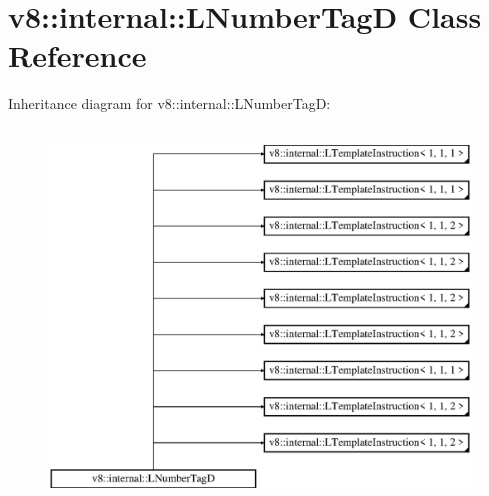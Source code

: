 \hypertarget{classv8_1_1internal_1_1_l_number_tag_d}{}\section{v8\+:\+:internal\+:\+:L\+Number\+TagD Class Reference}
\label{classv8_1_1internal_1_1_l_number_tag_d}
Inheritance diagram for v8\+:\+:internal\+:\+:L\+Number\+TagD\+:\begin{figure}[H]
\begin{center}
\leavevmode
\includegraphics[height=10.000000cm]{classv8_1_1internal_1_1_l_number_tag_d}
\end{center}
\end{figure}
